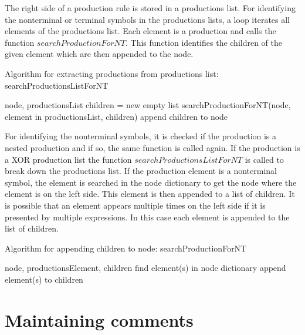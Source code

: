 The right side of a production rule is stored in a productions list.
For identifying the nonterminal or terminal symbols in the productions lists, a loop iterates all elements of the productions list.
Each element is a production and calls the function $searchProductionForNT$.
This function identifies the children of the given element which are then appended to the node.

\begin{algorithm}[H]
\caption{Algorithm for extracting productions from productions list: searchProductionsListForNT}
\begin{algorithmic}[1] 
\Require node, productionsList
	\State children = new empty list
	\State searchProductionForNT(node, element in productionsList, children)
	\State append children to node
\EndFor
\end{algorithmic}
\end{algorithm}

For identifying the nonterminal symbols, it is checked if the production is a nested production and if so, the same function is called again.
If the production is a XOR production list the function $searchProductionsListForNT$ is called to break down the productions list.
If the production element is a nonterminal symbol, the element is searched in the node dictionary to get the node where the element is on the left side.
This element is then appended to a list of children. It is possible that an element appears multiple times on the left side if it is presented by multiple expressions.
In this case each element is appended to the list of children.

\begin{algorithm}[H]
\caption{Algorithm for appending children to node: searchProductionForNT}
\begin{algorithmic}[1] 
\Require node, productionsElement, children
		\State find element(s) in node dictionary
		\State append element(s) to children
	\EndIf
\EndFor
\end{algorithmic}
\end{algorithm}

\section{Maintaining comments}\label{sec:ImplementationMaintainingComments}


